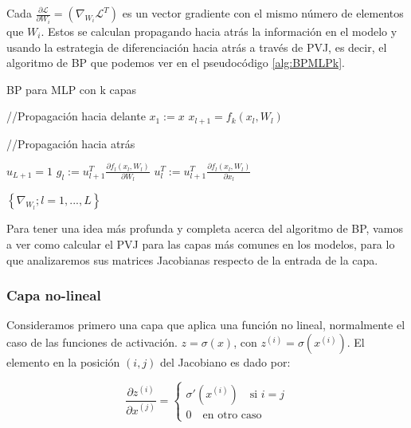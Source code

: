 Cada $\frac{\partial \mathcal{L}}{\partial W_i}= \left ( \nabla_{W_i} \mathcal{L}^T \right )$ es un vector gradiente con el mismo número de elementos que $W_i$. Estos se calculan propagando hacia atrás la información en el modelo y usando la estrategia de diferenciación hacia atrás a través de PVJ, es decir, el algoritmo de BP que podemos ver en el pseudocódigo \ref{alg:BPMLPk}. 



\begin{algorithm}
\caption{BP para MLP con k capas}
\label{alg:BPMLPk}
    \begin{algorithmic}
        \State //Propagación hacia delante
        \State $x_1:=x$
            \State $x_{l+1}=f_k(x_l, W_l)$
        \EndFor

        \State //Propagación hacia atrás

        \State $u_{L+1}=1$
            \State $g_l:= u_{l+1}^T \frac{\partial f_l(x_l, W_l)}{\partial W_l}$
            \State $u_l^T:=u_{l+1}^T\frac{\partial f_l(x_l, W_l)}{\partial x_l}$
        \EndFor
            

        \Return $\left \{  \nabla_{W_l}; l=1,...,L \right \}$
    \end{algorithmic}
\end{algorithm}


Para tener una idea más profunda y completa acerca del algoritmo de BP, vamos a ver como calcular el PVJ para las capas más comunes en los modelos, para lo que analizaremos sus matrices Jacobianas respecto de la entrada de la capa. 



\subsubsection{Capa no-lineal}



Consideramos primero una capa que aplica una función no lineal, normalmente el caso de las funciones de activación. $z=\sigma(x)$, con $z^(i) = \sigma(x^(i))$. El elemento en la posición $(i,j)$ del Jacobiano es dado por:

$$ \frac{\partial z^(i)}{\partial x^(j)} =  \left\{\begin{matrix}

\sigma'(x^(i)) \quad \textrm{si } i=j  \\
0 \quad \textrm{en otro caso}
\end{matrix}\right .
$$

